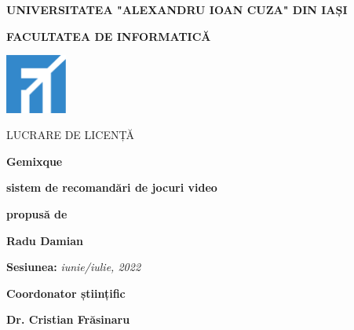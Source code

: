 \documentclass[12pt,a4paper]{report}
\begin{document}

\begin{titlepage}
	\centering
	{\scshape\large \textbf{UNIVERSITATEA "ALEXANDRU IOAN CUZA" DIN IAȘI} \par}
	\vspace{0.5cm}
	{\scshape\Large \textbf{FACULTATEA DE INFORMATICĂ}\par}
	\vspace{2cm}
	\includegraphics[width=0.15\textwidth]{logo-fii}\par\vspace{1cm}
	{\scshape\normalsize LUCRARE DE LICENȚĂ\par}
	\vspace{1cm}
	{\huge\bfseries Gemixque\par}
	\vspace{1cm}
	{\normalsize \textbf{sistem de recomandări de jocuri video}\par}
	\vspace{1.5cm}
	{\normalsize \textbf{propusă de}\par}
	\vspace{1cm}
	{\Large\textbf {Radu Damian}\par}
	\vspace{2cm}
	{\normalsize \textbf{Sesiunea:} \textit{iunie/iulie, 2022}\par}
	\vspace{1cm}
	{\normalsize \textbf{Coordonator științific}\par}
	\vspace{0.5cm}
	{\Large\textbf {Dr. Cristian Frăsinaru}\par}
\end{titlepage}
\end{document}
